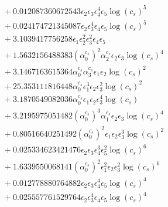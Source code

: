 \documentclass[10pt]{article}
\begin{document}
\begin{align*}
&{}  + 0.012087360672543 \epsilon_{2} \epsilon_{3} \epsilon_{4}^{4} \epsilon_{5} \log{\left(c_{s} \right)}^{5} \\
&{}  + 0.024174721345087 \epsilon_{2} \epsilon_{3}^{4} \epsilon_{4} \epsilon_{5} \log{\left(c_{s} \right)}^{5} \\
&{}  + 3.1039417756258 \epsilon_{1} \epsilon_{2}^{2} \epsilon_{3}^{2} \epsilon_{4} \epsilon_{5} \\
&{}  + 1.5632156488383 \left(\alpha_{0}^{c_s}\right)^{2} \alpha_{2}^{c_s} \epsilon_{2} \epsilon_{3} \log{\left(c_{s} \right)}^{4} \\
&{}  + 3.1467163615364 \alpha_{0}^{c_s} \alpha_{3}^{c_s} \epsilon_{1} \epsilon_{2} \log{\left(c_{s} \right)}^{2} \\
&{}  + 25.353111816448 \alpha_{0}^{c_s} \epsilon_{1}^{3} \epsilon_{2} \epsilon_{3}^{2} \log{\left(c_{s} \right)}^{2} \\
&{}  + 3.1870549082036 \alpha_{0}^{c_s} \epsilon_{1} \epsilon_{2} \epsilon_{3}^{4} \log{\left(c_{s} \right)} \\
&{}  + 3.2195975051482 \left(\alpha_{0}^{c_s}\right)^{3} \alpha_{1}^{c_s} \epsilon_{2} \epsilon_{3} \log{\left(c_{s} \right)}^{4} \\
&{}  + 0.80516640251492 \left(\alpha_{0}^{c_s}\right)^{2} \epsilon_{1} \epsilon_{2} \epsilon_{3}^{3} \log{\left(c_{s} \right)}^{2} \\
&{}  + 0.025334623421476 \epsilon_{2} \epsilon_{3} \epsilon_{4}^{3} \epsilon_{5}^{2} \log{\left(c_{s} \right)}^{6} \\
&{}  + 1.6339550068141 \left(\alpha_{0}^{c_s}\right)^{2} \epsilon_{1}^{2} \epsilon_{2} \epsilon_{3}^{2} \log{\left(c_{s} \right)}^{6} \\
&{}  + 0.012778880764882 \epsilon_{2} \epsilon_{3} \epsilon_{4}^{4} \epsilon_{5} \log{\left(c_{s} \right)}^{4} \\
&{}  + 0.025557761529764 \epsilon_{2} \epsilon_{3}^{4} \epsilon_{4} \epsilon_{5} \log{\left(c_{s} \right)}^{4}
\end{align*}
\end{document}
